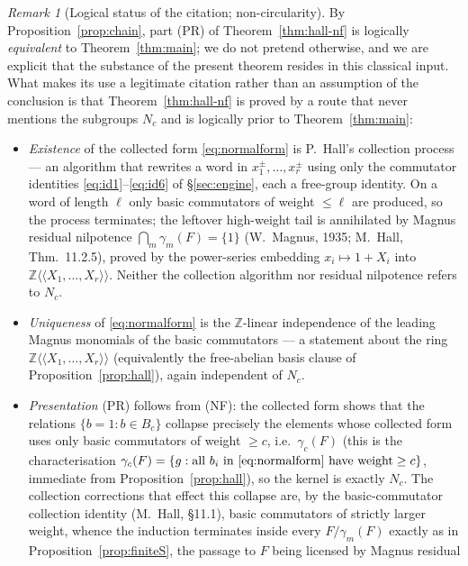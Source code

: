 \documentclass{amsart}
\theoremstyle{definition}
\theoremstyle{remark}
\newtheorem{remark}{Remark}
\begin{document}
\begin{remark}[Logical status of the citation; non-circularity]\label{rem:noncirc}
By Proposition~\ref{prop:chain}, part (PR) of Theorem~\ref{thm:hall-nf} is logically
\emph{equivalent} to Theorem~\ref{thm:main}; we do not pretend otherwise, and we are
explicit that the substance of the present theorem resides in this classical input.
What makes its use a legitimate citation rather than an assumption of the conclusion is
that Theorem~\ref{thm:hall-nf} is proved by a route that never mentions the subgroups
$N_c$ and is logically prior to Theorem~\ref{thm:main}:
\begin{itemize}
\item \emph{Existence} of the collected form \eqref{eq:normalform} is P.~Hall's
collection process --- an algorithm that rewrites a word in $x_1^{\pm},\dots,x_r^{\pm}$
using only the commutator identities \eqref{eq:id1}--\eqref{eq:id6} of
\S\ref{sec:engine}, each a free-group identity. On a word of length $\ell$ only basic
commutators of weight $\le\ell$ are produced, so the process terminates; the leftover
high-weight tail is annihilated by Magnus residual nilpotence
$\bigcap_m\gamma_m(F)=\{1\}$ (W.~Magnus, 1935; M.~Hall, Thm.~11.2.5), proved by the
power-series embedding $x_i\mapsto1+X_i$ into
$\mathbb Z\langle\langle X_1,\dots,X_r\rangle\rangle$. Neither the collection algorithm
nor residual nilpotence refers to $N_c$.
\item \emph{Uniqueness} of \eqref{eq:normalform} is the $\mathbb Z$-linear
independence of the leading Magnus monomials of the basic commutators --- a statement
about the ring $\mathbb Z\langle\langle X_1,\dots,X_r\rangle\rangle$ (equivalently the
free-abelian basis clause of Proposition~\ref{prop:hall}), again independent of $N_c$.
\item \emph{Presentation} (PR) follows from (NF): the collected form shows that the
relations $\{b=1:b\in B_c\}$ collapse precisely the elements whose collected form uses
only basic commutators of weight $\ge c$, i.e.\ $\gamma_c(F)$ (this is the
characterisation $\gamma_c(F)=\{g:\text{all }b_i\text{ in \eqref{eq:normalform} have
weight}\ge c\}$, immediate from Proposition~\ref{prop:hall}), so the kernel is exactly
$N_c$. The collection corrections that effect this collapse are, by the
basic-commutator collection identity (M.~Hall, \S11.1), basic commutators of strictly
larger weight, whence the induction terminates inside every $F/\gamma_m(F)$ exactly as
in Proposition~\ref{prop:finiteS}, the passage to $F$ being licensed by Magnus residual

\end{itemize}
\end{remark}
\end{document}
